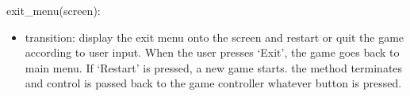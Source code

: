 \documentclass[12pt]{article}
\begin{document}
\noindent exit\_menu(screen):
\begin{itemize}
    \item transition: display the exit menu onto the screen and restart or quit the game according to user input. When the user presses `Exit', the game goes back to main menu. If `Restart' is pressed, a new game starts. the method terminates and control is passed back to the game controller whatever button is pressed.
\end{itemize}
\end{document}

